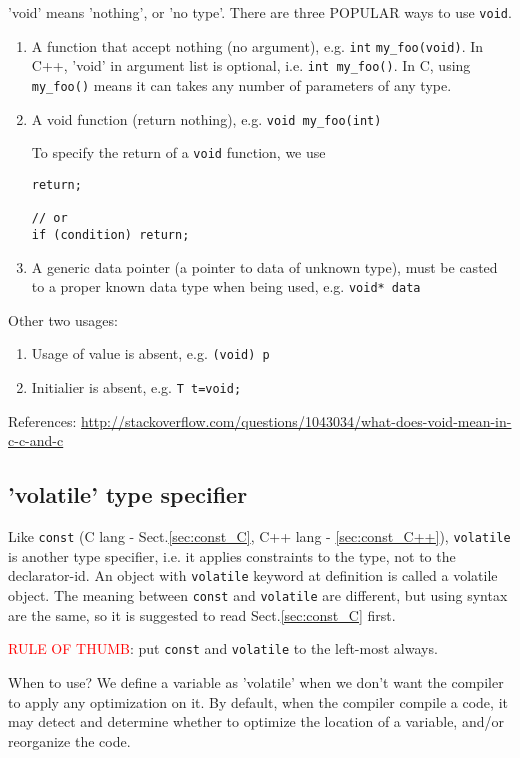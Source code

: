 'void' means 'nothing', or 'no type'. There are three POPULAR ways to use
\verb!void!.
\begin{enumerate}
  \item A function that accept nothing (no argument), e.g. \verb!int!
  \verb!my_foo(void)!. In C++, 'void' in argument list is optional,
  i.e. \verb!int my_foo()!. In C, using \verb!my_foo()! means it can takes any
  number of parameters of any type.
  
  \item A void function (return nothing), e.g. \verb!void my_foo(int)!
  
To specify the return of a \verb!void! function, we use 
\begin{verbatim}
return; 

// or 
if (condition) return;
\end{verbatim}

  \item A generic data pointer (a pointer to data of unknown type), must be
  casted to a proper known data type when being used, e.g. \verb!void* data!
\end{enumerate}

Other two usages:
\begin{enumerate}
  \item Usage of value is absent, e.g. \verb!(void) p!
  \item Initialier is absent, e.g. \verb!T t=void;!
\end{enumerate}

References:
\url{http://stackoverflow.com/questions/1043034/what-does-void-mean-in-c-c-and-c}

\subsection{'volatile' type specifier}
\label{sec:volatile_C}

Like \verb!const! (C lang - Sect.\ref{sec:const_C}, C++ lang -
\ref{sec:const_C++}), \verb!volatile! is another type specifier, i.e. it applies
constraints to the type, not to the declarator-id. An object with
\verb!volatile! keyword at definition is called a volatile object.
The meaning between \verb!const! and \verb!volatile! are different, but using
syntax are the same, so it is suggested to read Sect.\ref{sec:const_C} first. 

\textcolor{red}{RULE OF THUMB}: put \verb!const! and \verb!volatile! to the
left-most always.

When to use? We define a variable as 'volatile' when we don't want the compiler
to apply any optimization on it. By default, when the compiler compile a code,
it may detect and determine whether to optimize the location of a variable,
and/or reorganize the code.

